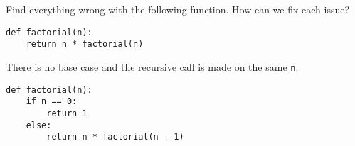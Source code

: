 \begin{blocksection}
\question Find everything wrong with the following function. How can we fix each issue?

\begin{lstlisting}
def factorial(n):
    return n * factorial(n)
\end{lstlisting}

\begin{solution}[1in]
There is no base case and the recursive call is made on the same \texttt{n}.

\begin{lstlisting}
def factorial(n):
    if n == 0:
        return 1
    else:
        return n * factorial(n - 1)
\end{lstlisting}
\end{solution}
\end{blocksection}
